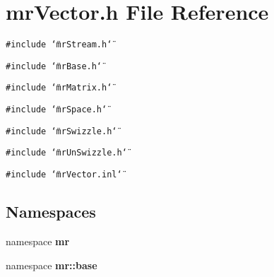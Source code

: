 \section{mr\-Vector.h File Reference}
\label{mrVector_8h}
{\tt \#include \char`\"{}mr\-Stream.h\char`\"{}}\par
{\tt \#include \char`\"{}mr\-Base.h\char`\"{}}\par
{\tt \#include \char`\"{}mr\-Matrix.h\char`\"{}}\par
{\tt \#include \char`\"{}mr\-Space.h\char`\"{}}\par
{\tt \#include \char`\"{}mr\-Swizzle.h\char`\"{}}\par
{\tt \#include \char`\"{}mr\-Un\-Swizzle.h\char`\"{}}\par
{\tt \#include \char`\"{}mr\-Vector.inl\char`\"{}}\par
\subsection*{Namespaces}
\begin{CompactItemize}
\item 
namespace {\bf mr}
\item 
namespace {\bf mr::base}
\end{CompactItemize}
